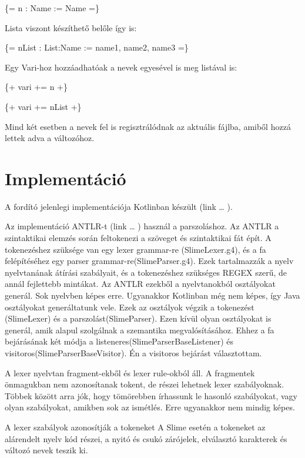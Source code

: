 {\{= n : Name := Name =\}

Lista viszont készíthető belőle így is:

\{= nList : List:Name := name1, name2, name3 =\}

Egy Vari-hoz hozzáadhatóak a nevek egyesével is meg listával is:

\{+ vari += n +\}

\{+ vari += nList +\}

Mind két esetben a nevek fel is regisztrálódnak az aktuális fájlba, amiből hozzá lettek adva a változóhoz.



\section{Implementáció}
A fordító jelenlegi implementációja Kotlinban készült (link … ).

Az implementáció ANTLR-t (link … ) használ a parszoláshoz. 
Az ANTLR a szintaktikai elemzés során feltokenezi a szöveget és szintaktikai fát épít. 
A tokenezéshez szüksége van egy lexer grammar-re (SlimeLexer.g4), és a fa felépítéséhez egy parser grammar-re(SlimeParser.g4). 
Ezek tartalmazzák a nyelv nyelvtanának átírási szabályait, és a tokenezéshez szükséges REGEX szerű, de annál fejlettebb mintákat. 
Az ANTLR ezekből a nyelvtanokból osztályokat generál. 
Sok nyelvben képes erre. 
Ugyanakkor Kotlinban még nem képes, így Java osztályokat generáltatunk vele. 
Ezek az osztályok végzik a tokenezést (SlimeLexer) és a parszolást(SlimeParser). 
Ezen kívül olyan osztályokat is generál, amik alapul szolgálnak a  szemantika megvalósításához. 
Ehhez a fa bejárásának két módja a listeneres(SlimeParserBaseListener) és visitoros(SlimeParserBaseVisitor).
Én a visitoros bejárást választottam. 

A lexer nyelvtan fragment-ekből és lexer rule-okból áll. 
A fragmentek önmagukban nem azonosítanak tokent, de részei lehetnek lexer szabályoknak. 
Többek között arra jók, hogy tömörebben írhassunk le hasonló szabályokat, vagy olyan szabályokat, amikben sok az ismétlés. 
Erre ugyanakkor nem mindig képes.

A lexer szabályok azonosítják a tokeneket
A Slime esetén a tokeneket az alárendelt nyelv kód részei, a nyitó és csukó zárójelek, elválasztó karakterek és változó nevek teszik ki.

}
